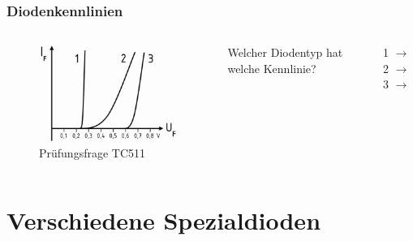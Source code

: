 \begin{frame}
  \frametitle{Diodenkennlinien}
  \begin{columns}[c]
    \begin{figure}
      \includegraphics[width=1\textwidth,height=.85\textheight,keepaspectratio]{a05/tc511.png}
      \caption{Prüfungsfrage TC511}
    \end{figure}
    Welcher Diodentyp hat welche Kennlinie?
    \begin{description}
      \item[1 $\rightarrow$] 
      \item[2 $\rightarrow$] 
      \item[3 $\rightarrow$] 
    \end{description}
  \end{columns}
\end{frame}

\section*{Verschiedene Spezialdioden}


